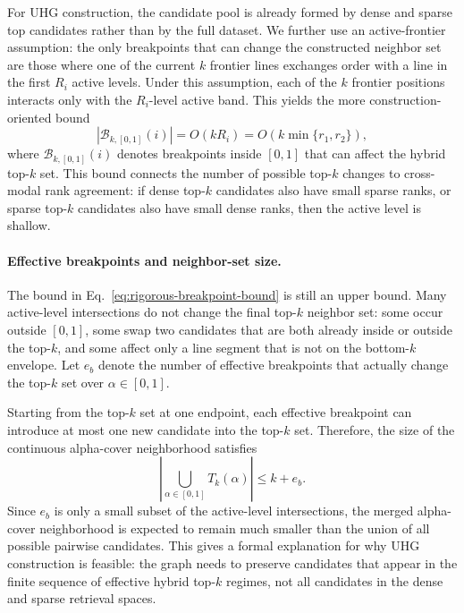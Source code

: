 For UHG construction, the candidate pool is already formed by dense and sparse top candidates rather than by the full dataset. We further use an active-frontier assumption: the only breakpoints that can change the constructed neighbor set are those where one of the current $k$ frontier lines exchanges order with a line in the first $R_i$ active levels. Under this assumption, each of the $k$ frontier positions interacts only with the $R_i$-level active band. This yields the more construction-oriented bound
\begin{equation}
    |\mathcal{B}_{k,[0,1]}(i)|=O(kR_i)
    =O(k\min\{r_1,r_2\}),
    \label{eq:rigorous-breakpoint-bound}
\end{equation}
where $\mathcal{B}_{k,[0,1]}(i)$ denotes breakpoints inside $[0,1]$ that can affect the hybrid top-$k$ set. This bound connects the number of possible top-$k$ changes to cross-modal rank agreement: if dense top-$k$ candidates also have small sparse ranks, or sparse top-$k$ candidates also have small dense ranks, then the active level is shallow.

\paragraph{Effective breakpoints and neighbor-set size.}
The bound in Eq.~\eqref{eq:rigorous-breakpoint-bound} is still an upper bound. Many active-level intersections do not change the final top-$k$ neighbor set: some occur outside $[0,1]$, some swap two candidates that are both already inside or outside the top-$k$, and some affect only a line segment that is not on the bottom-$k$ envelope. Let $e_b$ denote the number of effective breakpoints that actually change the top-$k$ set over $\alpha\in[0,1]$.

Starting from the top-$k$ set at one endpoint, each effective breakpoint can introduce at most one new candidate into the top-$k$ set. Therefore, the size of the continuous alpha-cover neighborhood satisfies
\begin{equation}
    \left|\bigcup_{\alpha\in[0,1]}T_k(\alpha)\right|
    \leq k+e_b.
    \label{eq:rigorous-neighbor-bound}
\end{equation}
Since $e_b$ is only a small subset of the active-level intersections, the merged alpha-cover neighborhood is expected to remain much smaller than the union of all possible pairwise candidates. This gives a formal explanation for why UHG construction is feasible: the graph needs to preserve candidates that appear in the finite sequence of effective hybrid top-$k$ regimes, not all candidates in the dense and sparse retrieval spaces.

